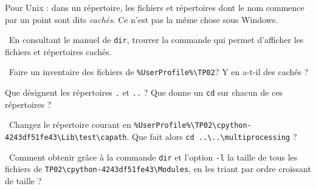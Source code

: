 \medskip 

Pour Unix : dans un répertoire, les fichiers et répertoires dont le nom
commence par un point sont dits \emph{cachés}. Ce n'est pas la même chose sous Windows.

\medskip

\question\ En consultant le manuel de \texttt{dir}, trouver la commande qui
permet d'afficher les fichiers et répertoires cachés.

\medskip

\question\ Faire un inventaire des fichiers de \texttt{\%UserProfile\%\textbackslash TP02}? Y en a-t-il des cachés ? 
  
\medskip

\question{} Que désignent les répertoires \texttt{.} et \texttt{..} ?
Que donne un \texttt{cd} sur chacun de ces répertoires ?

\medskip

\question\ Changez le répertoire courant en 
\texttt{\%UserProfile\%\textbackslash TP02\textbackslash cpython-4243df51fe43\textbackslash Lib\textbackslash test\textbackslash capath}. Que
fait   alors \texttt{cd ..\textbackslash ..\textbackslash multiprocessing} ?

\medskip

\question\ Comment obtenir grâce à la commande
\texttt{dir} et l'option \texttt{-l} la taille de tous les
fichiers de \texttt{TP02\textbackslash cpython-4243df51fe43\textbackslash Modules}, en les triant par ordre
croissant de taille ?
